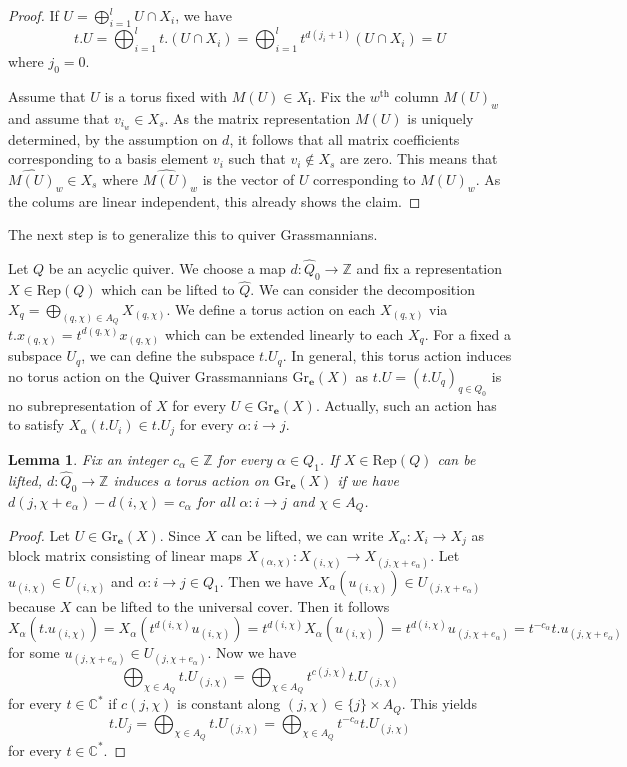 \documentclass{amsart}
\newtheorem{lemma}[theorem]{Lemma}
\newcommand{\bfe}{\mathbf{e}}
\newcommand{\bfi}{\mathbf{i}}
\newcommand{\C}{\mathbb{C}}
\newcommand{\Rep}{\mathrm{Rep}}
\newcommand{\Gr}{\mathrm{Gr}}
\newcommand{\ZZ}{\mathbb{Z}}
\begin{document}
\begin{proof}If $U=\bigoplus_{i=1}^l U\cap X_i$, we have 
\[t.U=\bigoplus_{i=1}^l t.(U\cap X_i)=\bigoplus_{i=1}^l t^{d(j_i+1)}(U\cap X_i)=U\]
where $j_0=0$.

Assume that $U$ is a torus fixed with $M(U)\in X_{\bfi}$. Fix the $w^{\mathrm{th}}$ column $M(U)_w$ and assume that $v_{i_w}\in X_s$. As the matrix representation $M(U)$ is uniquely determined, by the assumption on $d$, it follows that all matrix coefficients corresponding to a basis element $v_i$ such that $v_i\notin X_s$ are zero. This means that $\widehat{M(U)}_w\in X_s$ where $\widehat{M(U)}_w$ is the vector of $U$ corresponding to $M(U)_w$. As the colums are linear independent, this already shows the claim.
\end{proof}
The next step is to generalize this to quiver Grassmannians.

Let $Q$ be an acyclic quiver. We choose a map $d:\hat Q_0\to\ZZ$ and fix a representation $X\in\Rep(Q)$ which can be lifted to $\hat Q$. We can consider the decomposition $X_q=\bigoplus_{(q,\chi)\in A_Q} X_{(q,\chi)}$. We define a torus action on each $X_{(q,\chi)}$ via $t.x_{(q,\chi)}=t^{d(q,\chi)}x_{(q,\chi)}$ which can be extended linearly to each $X_q$. For a fixed a subspace $U_q$, we can define the subspace $t.U_q$. In general, this torus action induces no torus action on the Quiver Grassmannians $\Gr_{\bfe}(X)$ as $t.U=(t.U_q)_{q\in Q_0}$ is no subrepresentation of $X$ for every $U\in \Gr_{\bfe}(X)$. Actually, such an action has to satisfy $X_{\alpha}(t.U_i)\in t.U_j$ for every $\alpha:i\to j$. 
\begin{lemma}Fix an integer $c_\alpha\in\ZZ$ for every $\alpha\in Q_1$.
If $X\in\Rep(Q)$ can be lifted, $d:\hat Q_0\to\ZZ$ induces a torus action on $\Gr_\bfe(X)$ if we have $d(j,\chi+e_\alpha)-d(i,\chi)=c_\alpha$ for all $\alpha:i\to j$ and $\chi\in A_{Q}$.
\end{lemma}
\begin{proof} Let $U\in \Gr_\bfe(X)$. Since $X$ can be lifted, we can write $X_\alpha:X_i\to X_j$ as block matrix consisting of linear maps $X_{(\alpha,\chi)}:X_{(i,\chi)}\to X_{(j,\chi+e_\alpha)}$. Let $u_{(i,\chi)}\in U_{(i,\chi)}$ and $\alpha:i\to j\in Q_1$. Then we have $X_\alpha(u_{(i,\chi)})\in U_{(j,\chi+e_\alpha)}$ because $X$ can be lifted to the universal cover. Then it follows
\[X_\alpha(t.u_{(i,\chi)})=X_\alpha(t^{d(i,\chi)}u_{(i,\chi)})=t^{d(i,\chi)}X_\alpha(u_{(i,\chi)})=t^{d(i,\chi)}u_{(j,\chi+e_\alpha)}=t^{-c_\alpha}t.u_{(j,\chi+e_\alpha)}\]
for some $u_{(j,\chi+e_\alpha)}\in U_{(j,\chi+e_\alpha)}$.
Now we have \[\bigoplus_{\chi\in A_Q} t.U_{(j,\chi)}=\bigoplus_{\chi\in A_Q}t^{c(j,\chi)}t.U_{(j,\chi)}\]
for every $t\in\C^\ast$ if $c(j,\chi)$ is constant along $(j,\chi)\in \{j\}\times A_Q$. This yields  
\[t.U_j=\bigoplus_{\chi\in A_Q} t.U_{(j,\chi)}=\bigoplus_{\chi\in A_Q}t^{-c_\alpha}t.U_{(j,\chi)}\]
for every $t\in \C^\ast$.
\end{proof}
\end{document}
